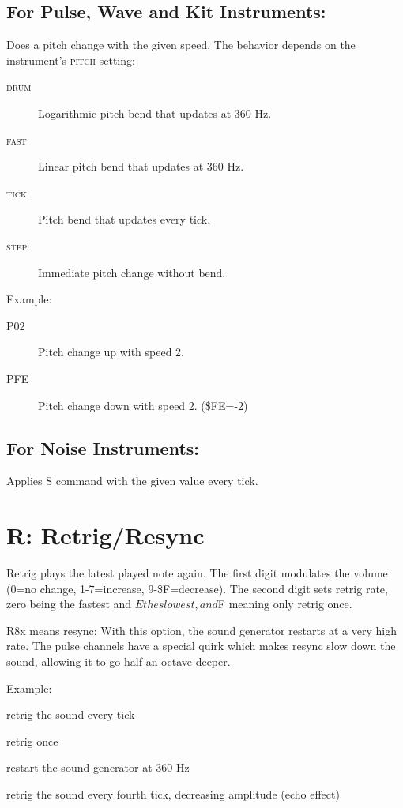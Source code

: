 \subsection{For Pulse, Wave and Kit Instruments:}

Does a pitch change with the given speed. The behavior depends on the instrument's \textsc{pitch} setting:

\begin{description}
    \item[\textsc{drum}] Logarithmic pitch bend that updates at 360 Hz.
    \item[\textsc{fast}] Linear pitch bend that updates at 360 Hz.
    \item[\textsc{tick}] Pitch bend that updates every tick.
    \item[\textsc{step}] Immediate pitch change without bend.
\end{description}

Example:

\begin{description}
\item[P02] Pitch change up with speed 2.
\item[PFE] Pitch change down with speed 2. (\$FE=-2)
\end{description}

\subsection{For Noise Instruments:}

Applies S command with the given value every tick.

\section{R: Retrig/Resync}

Retrig plays the latest played note again. The first digit modulates the volume (0=no change, 1-7=increase, 9-\$F=decrease). The second digit sets retrig rate, zero being the fastest and $E the slowest, and $F meaning only retrig once.

R8x means resync: With this option, the sound generator restarts at a very high rate. The pulse channels have a special quirk which makes resync slow down the sound, allowing it to go half an octave deeper.

\begin{description}
\item Example:
\item[R00] retrig the sound every tick
\item[R0F] retrig once
\item[R80] restart the sound generator at 360 Hz
\item[RF3] retrig the sound every fourth tick, decreasing amplitude (echo effect)
\end{description}

